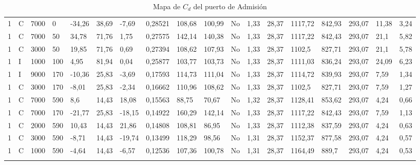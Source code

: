 {\begin{landscape}
\begin{longtable}{llllllllllllllllll}
    1 & C & 7000 & 0 & -34,26 & 38,69 & -7,69 & 0,28521 & 108,68 & 100,99 & No & 1,33 & 28,37 & 1117,72 & 842,93 & 293,07 & 11,38 & 3,24 \\
    1 & C & 7000 & 50 & 34,78 & 71,76 & 1,75 & 0,27575 & 142,14 & 140,38 & No & 1,33 & 28,37 & 1117,22 & 842,43 & 293,07 & 21,1 & 5,82 \\
    1 & C & 3000 & 50 & 19,85 & 71,76 & 0,69 & 0,27394 & 108,62 & 107,93 & No & 1,33 & 28,37 & 1102,5 & 827,71 & 293,07 & 21,1 & 5,78 \\
    1 & I & 1000 & 100 & 4,95 & 81,94 & 0,04 & 0,25877 & 103,77 & 103,73 & No & 1,33 & 28,37 & 1111,03 & 836,24 & 293,07 & 24,09 & 6,23 \\
    1 & I & 9000 & 170 & -10,36 & 25,83 & -3,69 & 0,17593 & 114,73 & 111,04 & No & 1,33 & 28,37 & 1114,72 & 839,93 & 293,07 & 7,59 & 1,34 \\
    1 & C & 3000 & 170 & -8,01 & 25,83 & -2,34 & 0,16662 & 110,96 & 108,62 & No & 1,33 & 28,37 & 1102,5 & 827,71 & 293,07 & 7,59 & 1,27 \\
    1 & C & 7000 & 590 & 8,6 & 14,43 & 18,08 & 0,15563 & 88,75 & 70,67 & No & 1,32 & 28,37 & 1128,41 & 853,62 & 293,07 & 4,24 & 0,66 \\
    1 & C & 7000 & 170 & -21,77 & 25,83 & -18,15 & 0,14922 & 160,29 & 142,14 & No & 1,33 & 28,37 & 1117,22 & 842,43 & 293,07 & 7,59 & 1,13 \\
    1 & C & 2000 & 590 & 10,43 & 14,43 & 21,86 & 0,14808 & 108,81 & 86,95 & No & 1,33 & 28,37 & 1112,38 & 837,59 & 293,07 & 4,24 & 0,63 \\
    1 & C & 3000 & 590 & -8,71 & 14,43 & -19,74 & 0,13499 & 118,29 & 98,56 & No & 1,31 & 28,37 & 1152,37 & 877,58 & 293,07 & 4,24 & 0,57 \\
    1 & C & 1000 & 590 & -4,64 & 14,43 & -6,57 & 0,12536 & 107,36 & 100,78 & No & 1,31 & 28,37 & 1164,49 & 889,7 & 293,07 & 4,24 & 0,53 \\ \bottomrule
    \caption{Mapa de $C_d$ del puerto de Admisión} \label{tab:mapa_cd_admision}
    \end{longtable}
\end{landscape}
}

